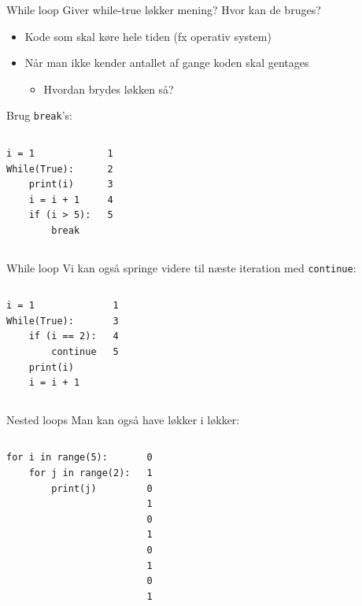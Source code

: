 \begin{frame}[fragile]{While loop}
	Giver while-true løkker mening? Hvor kan de bruges?
	\pause
	\begin{itemize}
		\item Kode som skal køre hele tiden (fx operativ system)
		\item Når man ikke kender antallet af gange koden skal gentages
		\begin{itemize}
			\item Hvordan brydes løkken så?
		\end{itemize}
	\end{itemize}
	\pause
	Brug \texttt{break}'s:
	\begin{columns}
		\begin{lstlisting}[style=python]
i = 1
While(True):
	print(i)
	i = i + 1
	if (i > 5):
		break
		\end{lstlisting}
		\pause
		\begin{lstlisting}[style=python]
1
2
3
4
5
		\end{lstlisting}
	\end{columns}
\end{frame}

\begin{frame}[fragile]{While loop}
	Vi kan også springe videre til næste iteration med \texttt{continue}:
	\begin{columns}
		\column{0.4\textwidth}
		\begin{lstlisting}[style=python]
i = 1
While(True):
	if (i == 2):
		continue
	print(i)
	i = i + 1
		\end{lstlisting}
		\column{0.4\textwidth}
		\begin{lstlisting}[style=python]
1
3
4
5
		\end{lstlisting}
	\end{columns}
\end{frame}

\begin{frame}[fragile]{Nested loops}
	Man kan også have løkker i løkker:
	\begin{columns}
		\begin{lstlisting}[style=python]
for i in range(5):
	for j in range(2):
		print(j)
		\end{lstlisting}
		\pause
		\begin{lstlisting}[style=python]
0
1
0
1
0
1
0
1
0
1
		\end{lstlisting}
	\end{columns}
\end{frame}

